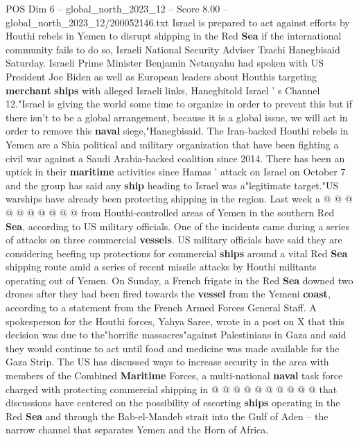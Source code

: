 \begin{textsample}{POS Dim 6 – global\_north\_2023\_12 – Score 8.00 – global\_north\_2023\_12/200052146.txt}  \label{ex:f6_pos_184}
Israel is prepared to act against efforts by Houthi rebels in Yemen to disrupt shipping in the Red \textbf{Sea} if the international community fails to do so, Israeli National Security Adviser Tzachi Hanegbisaid Saturday.
Israeli Prime Minister Benjamin Netanyahu had spoken with US President Joe Biden as well as European leaders about Houthis targeting \textbf{merchant} \textbf{ships} with alleged Israeli links, Hanegbitold Israel ' s Channel 12."Israel is giving the world some time to organize in order to prevent this but if there isn't to be a global arrangement, because it is a global issue, we will act in order to remove this \textbf{naval} siege,"Hanegbisaid.
The Iran-backed Houthi rebels in Yemen are a Shia political and military organization that have been fighting a civil war against a Saudi Arabia-backed coalition since 2014.
There has been an uptick in their \textbf{maritime} activities since Hamas ' attack on Israel on October 7 and the group has said any \textbf{ship} heading to Israel was a"legitimate target."US warships have already been protecting shipping in the region.
Last week a @ @ @ @ @ @ @ @ @ @ from Houthi-controlled areas of Yemen in the southern Red \textbf{Sea}, according to US military officials.
One of the incidents came during a series of attacks on three commercial \textbf{vessels}.
US military officials have said they are considering beefing up protections for commercial \textbf{ships} around a vital Red \textbf{Sea} shipping route amid a series of recent missile attacks by Houthi militants operating out of Yemen.
On Sunday, a French frigate in the Red \textbf{Sea} downed two drones after they had been fired towards the \textbf{vessel} from the Yemeni \textbf{coast}, according to a statement from the French Armed Forces General Staff.
A spokesperson for the Houthi forces, Yahya Saree, wrote in a post on X that this decision was due to the"horrific massacres"against Palestinians in Gaza and said they would continue to act until food and medicine was made available for the Gaza Strip.
The US has discussed ways to increase security in the area with members of the Combined \textbf{Maritime} Forces, a multi-national \textbf{naval} task force charged with protecting commercial shipping in @ @ @ @ @ @ @ @ @ @ that discussions have centered on the possibility of escorting \textbf{ships} operating in the Red \textbf{Sea} and through the Bab-el-Mandeb strait into the Gulf of Aden -- the narrow channel that separates Yemen and the Horn of Africa.

\end{textsample}
